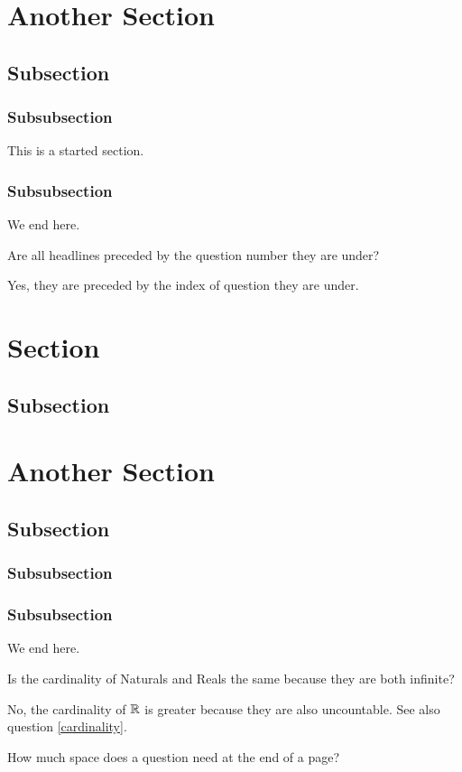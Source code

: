 \documentclass{homework}
\begin{document}
\section{Another Section}
\subsection{Subsection}
\subsubsection*{Subsubsection} This is a started section.
\subsubsection{Subsubsection} We end here.

\question Are all headlines preceded by the question number they are under?

Yes, they are preceded by the index of question they are under.

\section{Section}
\subsection{Subsection}
\section{Another Section}
\subsection{Subsection}
\subsubsection{Subsubsection}
\subsubsection{Subsubsection} We end here.

\question[IX]\label{custom-index} Is the cardinality of Naturals and Reals the same because they are both infinite?

No, the cardinality of $\mathbb{R}$ is greater because they are also uncountable. See also question \ref{cardinality}.

\question How much space does a question need at the end of a page?
\end{document}

